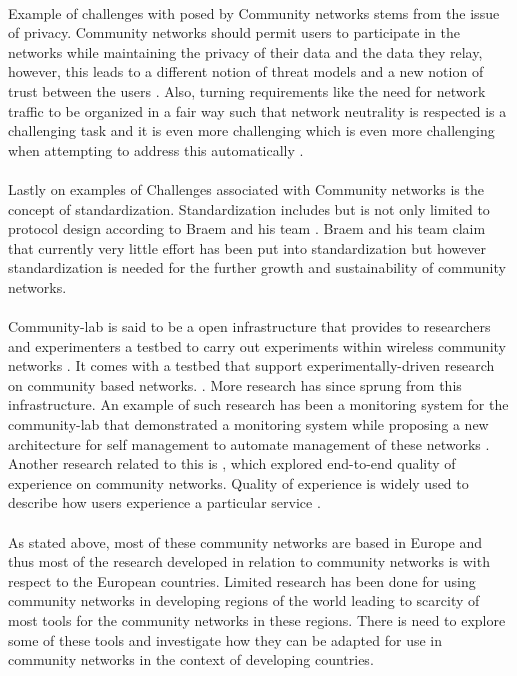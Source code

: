 \paragraph{}
Example of challenges with posed by Community networks stems from the issue of privacy.
Community networks should permit users to participate in the networks while maintaining the privacy of their data and the data they relay, however, this leads to a different notion of threat models and a new notion of trust between the users \cite{Braem:2013:CRC:2500098.2500108}.
Also, turning requirements like the need for network traffic to be organized in a fair way such that network neutrality is respected is a challenging task and it is even more challenging which is even more challenging when attempting to address this automatically \cite{Braem:2013:CRC:2500098.2500108}.
\paragraph{}
Lastly on examples of Challenges associated with Community networks is the concept of standardization.
Standardization includes but is not only limited to protocol design according to Braem and his team \cite{Braem:2013:CRC:2500098.2500108}.
Braem and his team \cite{Braem:2013:CRC:2500098.2500108} claim that currently very little effort has been put into standardization but however standardization is needed for the further growth and sustainability of community networks.
\paragraph{}
Community-lab is said to be a open infrastructure that provides to researchers and experimenters a testbed to carry out experiments within wireless community networks \cite{Rameshan:2013:MSC:2508222.2512838}.
It comes with a testbed that support experimentally-driven research on community based networks. \cite{Braem:2013:CRC:2500098.2500108}.
More research has since sprung from this infrastructure.
An example of such research has been a monitoring system for the community-lab  that demonstrated a monitoring system while proposing a new architecture for self management to automate management of these networks \cite{Rameshan:2013:MSC:2508222.2512838}.
Another research related to this is \cite{Braem:2015:AEQ:2830629.2830639}, which explored end-to-end quality of experience on community networks.
Quality of experience is widely used to describe how users experience a particular service \cite{6462223}.
\paragraph{}As stated above, most of these community networks are based in Europe and thus most of the research developed in relation to community networks is with respect to the European countries.
Limited research has been done for using community networks in developing regions of the world leading to scarcity of most tools for the community networks in these regions.
There is need to explore some of these tools and investigate how they can be adapted for use in community networks in the context of developing countries.

